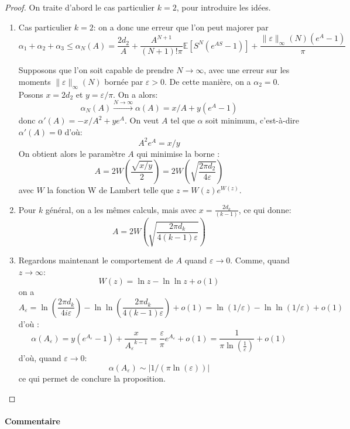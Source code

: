 \documentclass[12pt]{article}
\newcounter{prop}[section]
\newcommand{\pth}[1]{\left(#1\right)}
\newcommand{\cro}[1]{\left[#1\right]}
\newcommand{\abs}[1]{\left|#1\right|}
\newcommand{\dabs}[1]{\|#1\|}
\newcommand{\Esp}[1]{\mathbb{E}\cro{#1}}
\begin{document}
\begin{proof} On traite d'abord le cas particulier $k=2$, pour introduire les idées.
\begin{enumerate}
\item Cas particulier $k=2$: on a donc une erreur que l'on peut majorer par
\[\alpha_1+\alpha_2+\alpha_3 \leqslant \alpha_N(A)=\frac{2d_2}{A}+\frac{A^{N+1}}{(N+1)!\pi}\Esp{S^N(e^{AS}-1)}+\frac{\dabs{\varepsilon}_{\infty}(N)(e^A-1)}{\pi}\]

Supposons que l'on soit capable de prendre $N\to\infty$, avec une erreur sur les moments $\dabs{\varepsilon}_{\infty}(N)$ bornée par $\varepsilon>0$. De cette manière, on a $\alpha_2=0$. Posons $x=2d_2$ et $y=\varepsilon/\pi$. On a alors:
\[\alpha_N(A)\xrightarrow{N\to\infty}\alpha(A)=x/A+y(e^A-1)\]
donc $\alpha'(A)=-x/A^2+ye^A$. On veut $A$ tel que $\alpha$ soit minimum, c'est-à-dire $\alpha'(A)=0$ d'où:
\[A^2e^A=x/y\]
On obtient alors le paramètre $A$ qui minimise la borne : 
\[A = 2W\pth{\frac{\sqrt{x/y}}2} = 2W\pth{\sqrt{\frac{2\pi d_2}{4 \varepsilon}}}\]
avec $W$ la fonction W de Lambert telle que $z=W(z)e^{W(z)}$.

\item Pour $k$ général, on a les mêmes calculs, mais avec $x=\frac{2d_k}{(k-1)}$, ce qui donne:
\[A=2W\pth{\sqrt{\frac{2\pi d_k}{4(k-1)\varepsilon}}}\]

\item Regardons maintenant le comportement de $A$ quand $\varepsilon\to 0$. Comme, quand $z\to\infty$:
\[W(z)=\ln z-\ln\ln z+o(1)\] on a \[A_\varepsilon= \ln\pth{\frac{2\pi d_k}{4i\varepsilon}}-\ln\ln\pth{\frac{2\pi d_k}{4(k-1)\varepsilon}}+o(1)= \ln(1/\varepsilon)-\ln\ln(1/\varepsilon)+o(1)\] 
d'où :
\[\alpha(A_\varepsilon)=y(e^{A_\varepsilon}-1) + \frac{x}{{A_\varepsilon}^{k-1}}=\frac{\varepsilon}{\pi}e^{A_{\varepsilon}}+o(1)=\frac{1}{\pi\ln\pth{\frac{1}{\varepsilon}}}+o(1)\]
d'où, quand $\varepsilon\to 0$:
\[\alpha(A_\varepsilon)\sim \abs{1/(\pi\ln(\varepsilon))}\]
ce qui permet de conclure la proposition. 
\end{enumerate}
\end{proof}


\paragraph{Commentaire}
\end{document}
